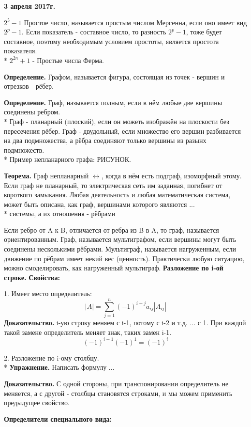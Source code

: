 \documentclass{article}
\begin{document}
\textbf {3 апреля 2017г.}

$2^5-1$ Простое число, называется простым числом Мерсенна, если оно имеет вид $2^p-1$. Если показатель - составное число, то разность $2^p-1$, тоже будет составное, поэтому необходимым условием простоты, является простота показателя.\\*
$2^{2n}+1$ - Простые числа Ферма.

{\bf Определение.} Графом, называется фигура, состоящая из точек - вершин и отрезков - рёбер.

{\bf Определение.} Граф, называется полным, если в нём любые две вершины соединены ребром.\\*
Граф - планарный (плоский), если он можеть изображён на плоскости без пересечения рёбер. Граф - двудольный, если множество его вершин разбивается на два подмножества, а рёбра соединяют только вершины из разынх подмножеств.\\*
Пример непланарного графа: РИСУНОК.

{\bf Теорема.} Граф непланарный $\leftrightarrow$, когда в нём есть подграф, изоморфный этому. Если граф не планарный, то электрическая сеть им заданная, погибнет от короткого замыкания. Любая деятельность и любая математическая система, может быть описана, как граф, вершинами которого являются ...\\*
системы, а их отношения - рёбрами

Если ребро от A к B, отличается от ребра из B в A, то граф, называется ориентированным.
Граф, называется мультиграфом, если вершины могут быть соединены несколькими рёбрами. Мультиграф, называется нагруженным, если движение по рёбрам имеет некий вес (ценность). Практически любую ситуацию, можно смоделировать, как нагруженный мультиграф.
{\bf Разложение по i-ой строке.}
{\bf Свойства:}

1. Имеет место определитель: $$|A|=\sum_{j=1}^n (-1)^{i+j}a_{ij}|A_{ij}|$$
{\bf Доказательство.} i-ую строку меняем с i-1, потому с i-2 и т.д. $\ldots$ с 1. При каждой такой замене определитель меняет знак, таких замен i-1. $$(-1)^{i-1}(-1)^1=(-1)^i$$

2. Разложение по i-ому столбцу.\\*
{\bf Упражнение.} Написать формулу ...

{\bf Доказательство.} С одной стороны, при транспонировании определитель не меняется, а с другой - столбцы становятся строками, и мы можем применить предыдущее свойство.

{\bf Определители специального вида:}
\end{document}

